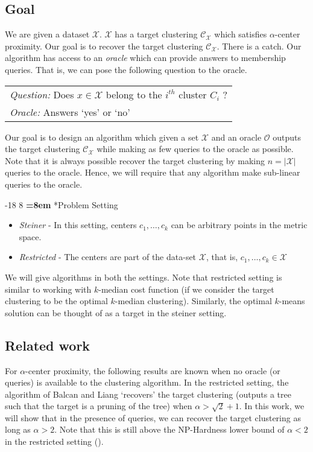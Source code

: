 \documentclass[orivec]{llncs}
\makeatletter
\newcommand{\mc}{\mathcal}
\renewcommand\subsubsection{\@startsection{subsubsection}{3}{\z@}%
   {-18\p@ \@plus -4\p@ \@minus -4\p@}%
   {8\p@ \@plus 4\p@ \@minus 4\p@}%
   {\normalfont\normalsize\bfseries\boldmath
   \rightskip=\z@ \@plus 8em \pretolerance=10000}}
\makeatother
\begin{document}
\subsection{Goal}
We are given a dataset $\mc X$. $\mc X$ has a target clustering $\mc C_{\mc X}$ which satisfies $\alpha$-center proximity. Our goal is to recover the target clustering $\mc C_{\mc X}$. There is a catch. Our algorithm has access to an {\it oracle} which can provide answers to membership queries. That is, we can pose the following question to the oracle.
\begin{center}
  \begin{tabular}{l}
	{\it Question:} Does $x \in \mc X$ belong to the $i^{th}$ cluster $C_i$ ? \\
	{\it Oracle:} Answers `yes' or `no'
  \end{tabular}
\end{center}

\noindent Our goal is to design an algorithm which given a set $\mc X$ and an oracle $\mc O$ outputs the target clustering $\mc C_{\mc X}$ while making as few queries to the oracle as possible. Note that it is always possible recover the target clustering by making $n = |\mc X|$ queries to the oracle. Hence, we will require that any algorithm make sub-linear queries to the oracle. 

\subsubsection*{Problem Setting}
\begin{itemize}[nolistsep, noitemsep]
\item {\it Steiner} - In this setting, centers $c_1, \ldots, c_k$ can be arbitrary points in the metric space.
\item {\it Restricted} - The centers are part of the data-set $\mc X$, that is, $c_1, \ldots, c_k \in \mc X$ \\
\end{itemize}
We will give algorithms in both the settings. Note that restricted setting is similar to working with $k$-median cost function (if we consider the target clustering to be the optimal $k$-median clustering). Similarly, the optimal $k$-means solution can be thought of as a target in the steiner setting.

\subsection{Related work}
\label{section:relatedwork}
For $\alpha$-center proximity, the following results are known when no oracle (or queries) is available to the clustering algorithm. In the restricted setting, the algorithm of Balcan and Liang \cite{balcan2012clustering} `recovers' the target clustering (outputs a tree such that the target is a pruning of the tree) when $\alpha > \sqrt{2} + 1$. In this work, we will show that in the presence of queries, we can recover the target clustering as long as $\alpha > 2$. Note that this is still above the NP-Hardness lower bound of $\alpha < 2$ in the restricted setting (\cite{ben2014data}).
\end{document}
